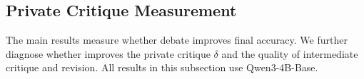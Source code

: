 \begin{table}[t]
  \caption{Prompt-based role-assigned debate results on Qwen3-4B-Base. We report accuracy after each debate round. Best results are bolded within each benchmark and round.}
  \label{tab:app-prompt-role}
  \begin{center}
  \end{center}
  \vskip -0.1in
\end{table}


\subsection{Private Critique Measurement}
\label{app:critique_quality}

The main results measure whether debate improves final accuracy. We further diagnose whether \SDRL{} improves the private critique $\delta$ and the quality of intermediate critique and revision. All results in this subsection use Qwen3-4B-Base.

